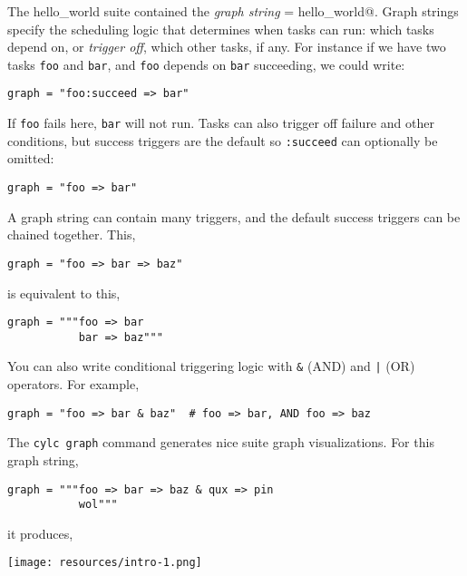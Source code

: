 The hello\_world suite contained the {\em graph string}
\lstinline@graph = hello_world@.  Graph strings specify the scheduling logic
that determines when tasks can run: which tasks depend on, or {\em trigger off},
which other tasks, if any.  For instance if we have two tasks \lstinline{foo}
and \lstinline{bar}, and \lstinline{foo} depends on \lstinline{bar} succeeding,
we could write:

\begin{lstlisting}[language=suiterc]
graph = "foo:succeed => bar"
\end{lstlisting}

If \lstinline{foo} fails here, \lstinline{bar} will not run.  Tasks can also
trigger off failure and other conditions, but success triggers are the default
so \lstinline=:succeed= can optionally be omitted:

\begin{lstlisting}[language=suiterc]
graph = "foo => bar"
\end{lstlisting}

A graph string can contain many triggers, and the default success triggers can
be chained together. This,

\begin{lstlisting}[language=suiterc]
graph = "foo => bar => baz"
\end{lstlisting}

is equivalent to this,

\begin{lstlisting}[language=suiterc]
graph = """foo => bar
           bar => baz"""
\end{lstlisting}

You can also write conditional triggering logic with \lstinline=&= (AND) and
\lstinline=|= (OR) operators. For example,

\begin{lstlisting}[language=suiterc]
graph = "foo => bar & baz"  # foo => bar, AND foo => baz
\end{lstlisting}

The \lstinline=cylc graph= command generates nice suite graph visualizations.
For this graph string,

\begin{lstlisting}[language=suiterc]
graph = """foo => bar => baz & qux => pin
           wol"""
\end{lstlisting}

it produces,

\begin{center}
\texttt{[image: resources/intro-1.png]} %
\end{center}

